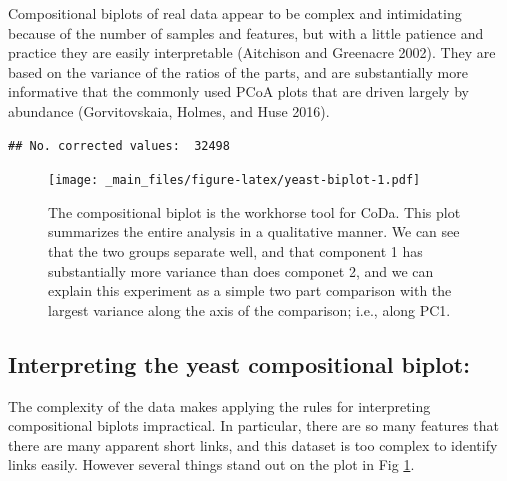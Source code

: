 \documentclass[onecolumn]{article}
\begin{document}
Compositional biplots of real data appear to be complex and intimidating because of the number of samples and features, but with a little patience and practice they are easily interpretable (Aitchison and Greenacre 2002). They are based on the variance of the ratios of the parts, and are substantially more informative that the commonly used PCoA plots that are driven largely by abundance (Gorvitovskaia, Holmes, and Huse 2016).

\begin{verbatim}
## No. corrected values:  32498
\end{verbatim}

\begin{figure}
\centering
\texttt{[image: \_main\_files/figure-latex/yeast-biplot-1.pdf]}
\caption{\label{fig:yeast-biplot}The compositional biplot is the workhorse tool for CoDa. This plot summarizes the entire analysis in a qualitative manner. We can see that the two groups separate well, and that component 1 has substantially more variance than does componet 2, and we can explain this experiment as a simple two part comparison with the largest variance along the axis of the comparison; i.e., along PC1.}
\end{figure}

\hypertarget{interpreting-the-yeast-compositional-biplot}{%
\subsection{Interpreting the yeast compositional biplot:}\label{interpreting-the-yeast-compositional-biplot}}

The complexity of the data makes applying the rules for interpreting compositional biplots impractical. In particular, there are so many features that there are many apparent short links, and this dataset is too complex to identify links easily. However several things stand out on the plot in Fig \ref{fig:yeast-biplot}.
\end{document}
